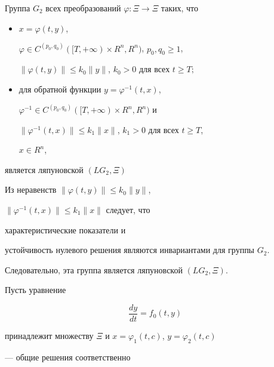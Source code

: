 \begin{thm} 


Группа $G_2$ всех преобразований $\varphi:\Xi\to\Xi$ таких, что 


\begin{itemize} 


\item[1)] $x=\varphi(t,y)$, 


$\varphi\in C^{(p_0,q_0)}([T,+\infty)\times R^n,R^n)$, $p_0,q_0\ge 1$, 


$\|\varphi(t,y)\|\le k_0\|y\|$, $k_0>0$ для всех $t\ge T;$ 


\item[2)] для обратной функции $y=\varphi^{-1}(t,x)$, 


$\varphi^{-1}\in C^{(p_0,q_0)}([T,+\infty)\times R^n,R^n)$ и 


$\|\varphi^{-1}(t,x)\|\le k_1\|x\|$, $k_1>0$ для всех $t\ge T$, 


$x\in R^n$, 


\end{itemize} 


является ляпуновской $(LG_2,\Xi)$ 


\end{thm} 


 


\begin{pf} 


Из неравенств $\|\varphi(t,y)\|\le k_0\|y\|$, 


$\|\varphi^{-1}(t,x)\|\le k_1\|x\|$ следует, что 


характеристические показатели и 


устойчивость нулевого решения являются инвариантами для группы $G_2$. 


Следовательно, эта группа является ляпуновской $(LG_2,\Xi)$. 


\end{pf} 


 


Пусть уравнение 


\begin{equation} 


\frac{dy}{dt}=f_0(t,y) 


\end{equation} 


принадлежит множеству $\Xi$ и $x=\varphi_1(t,c)$, $y=\varphi_2(t,c)$ 


--- общие решения соответственно 


